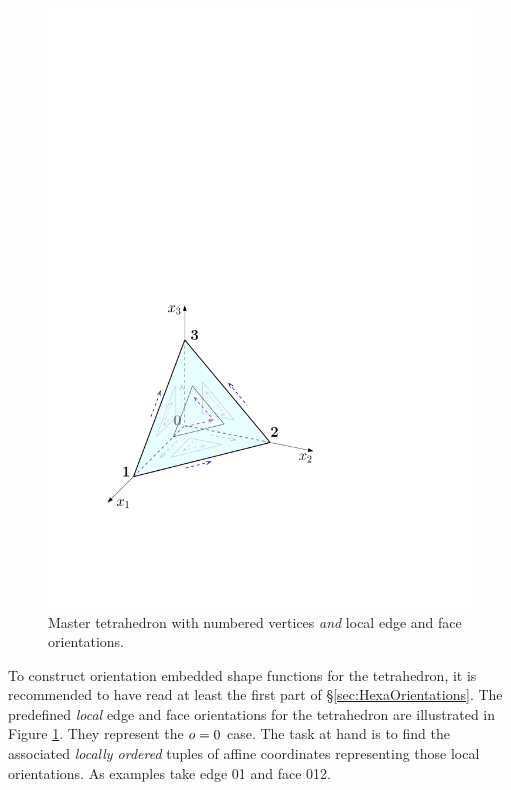 \begin{figure}[!ht]
\begin{center}
\includegraphics[scale=0.5]{./figures/MasterTetOrientations.pdf}
\caption{Master tetrahedron with numbered vertices \textit{and} local edge and face orientations.}
\label{fig:MasterTetOrientations}
\end{center}
\end{figure}

To construct orientation embedded shape functions for the tetrahedron, it is recommended to have read at least the first part of \S\ref{sec:HexaOrientations}.
The predefined \textit{local} edge and face orientations for the tetrahedron are illustrated in Figure \ref{fig:MasterTetOrientations}.
They represent the $o=0$ case.
The task at hand is to find the associated \textit{locally ordered} tuples of affine coordinates representing those local orientations.
As examples take edge 01 and face 012.

